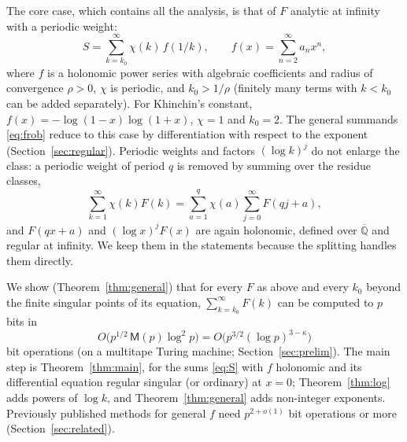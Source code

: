 \documentclass[11pt,reqno]{amsart}
\theoremstyle{definition}
\theoremstyle{remark}
\newcommand{\Qbar}{\overline{\mathbb{Q}}}
\newcommand{\Mul}{\mathsf{M}}
\begin{document}



The core case, which contains all the analysis, is that of $F$ analytic at infinity with a periodic weight:
\begin{equation}\label{eq:S}
  S = \sum_{k=k_0}^{\infty} \chi(k)\, f(1/k), \qquad f(x) = \sum_{n=2}^{\infty} a_n x^n,
\end{equation}
where $f$ is a holonomic power series with algebraic coefficients and radius of
convergence $\rho > 0$, $\chi$ is periodic, and $k_0 > 1/\rho$ (finitely many terms with $k < k_0$ can be added
separately). For Khinchin's constant, $f(x) = -\log(1-x)\log(1+x)$, $\chi = 1$ and $k_0 = 2$. The general
summands \eqref{eq:frob} reduce to this case by differentiation with respect to the exponent
(Section~\ref{sec:regular}). Periodic weights and factors $(\log k)^j$ do not enlarge the class: a periodic
weight of period $q$ is removed by summing over the residue classes,
\[
  \sum_{k=1}^{\infty} \chi(k)F(k) = \sum_{a=1}^{q}\chi(a)\sum_{j=0}^{\infty} F(qj+a),
\]
and $F(qx+a)$ and $(\log x)^jF(x)$ are again
holonomic, defined over $\Qbar$ and regular at infinity. We keep them in the statements because the splitting
handles them directly.

We show (Theorem~\ref{thm:general}) that for every $F$ as above and every $k_0$ beyond the finite singular
points of its equation, $\sum_{k=k_0}^{\infty}F(k)$ can be computed to $p$ bits in
\[
  O\bigl(p^{1/2}\, \Mul(p) \log^2 p\bigr) = O\bigl(p^{3/2}(\log p)^{3-\kappa}\bigr)
\]
bit operations (on a multitape Turing machine; Section~\ref{sec:prelim}). The main step is Theorem~\ref{thm:main}, for the sums \eqref{eq:S} with $f$ holonomic and its
differential equation regular singular (or ordinary) at $x = 0$; Theorem~\ref{thm:log} adds powers of
$\log k$, and Theorem~\ref{thm:general} adds non-integer exponents. Previously published methods for general $f$
need $p^{2+o(1)}$ bit operations or more (Section~\ref{sec:related}).
\end{document}
